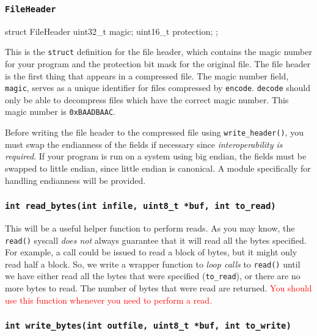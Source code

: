 \documentclass{article}
\begin{document}
\subsubsection{\texttt{FileHeader}}

\begin{clisting}{}
struct FileHeader {
    uint32_t magic;
    uint16_t protection;
};
\end{clisting}

This is the \texttt{struct} definition for the file header, which
contains the magic number for your program and the protection bit mask
for the original file.  The file header is the first thing that appears
in a compressed file. The magic number field, \texttt{magic}, serves as
a unique identifier for files compressed by \texttt{encode}.
\texttt{decode} should only be able to decompress files which have the
correct magic number. This magic number is \texttt{0xBAADBAAC}.

Before writing the file header to the compressed file using
\texttt{write\_header()}, you must swap the endianness of the fields if
necessary since \emph{interoperability is required}. If your program is
run on a system using big endian, the fields must be swapped to little
endian, since little endian is canonical. A module specifically for
handling endianness will be provided.

\subsubsection{\texttt{int read\_bytes(int infile, uint8\_t *buf, int
to\_read)}}

This will be a useful helper function to perform reads. As you may know,
the \texttt{read()} syscall \emph{does not} always guarantee that it
will read all the bytes specified. For example, a call could be issued
to read a block of bytes, but it might only read half a block. So, we
write a wrapper function to \emph{loop calls} to \texttt{read()} until
we have either read all the bytes that were specified
(\texttt{to\_read}), or there are no more bytes to read. The number of
bytes that were read are returned. \textcolor{red}{You should use this
function whenever you need to perform a read.}

\subsubsection{\texttt{int write\_bytes(int outfile, uint8\_t *buf, int
to\_write)}}
\end{document}
